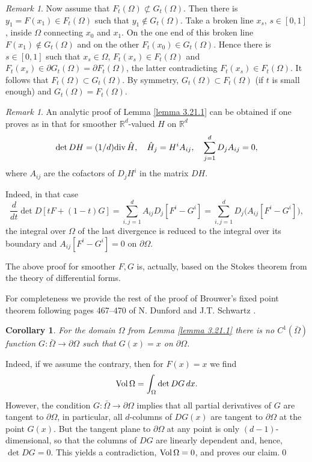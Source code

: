 \documentclass[11pt, reqno]{amsart}
\newtheorem{corollary}[theorem]{Corollary}
\theoremstyle{remark}
\newtheorem{remark}[theorem]{Remark}
\theoremstyle{definition}
\newcommand{\Vol}{\text{\rm Vol}\,}
\newcommand\bR{\mathbb{R}}
\begin{document}
\begin{remark}
Now assume that $F_{t}(\Omega)\not\subset
 G_{t}(\Omega)$. Then there is $y_{1}=F(x_{1})\in 
F_{t}(\Omega)$ such that $y_{1}\not\in 
G_{t}(\Omega)$. Take a broken line $x_{s}$, $s\in[0,1]$,
 inside
$\Omega$ connecting $x_{0}$ and $x_{1}$.
On the one end of this broken line $F(x_{1})
\not\in 
G_{t}(\Omega)$ and on the other $F_{t}(x_{0})
\in G_{t}(\Omega)$. Hence there is $s\in[0,1]$
such that $x_{s}\in \Omega$, $F_{t}(x_{s})
\in F_{t}(\Omega)$ and $F_{t}(x_{s})\in \partial
G_{t}(\Omega)=\partial
F_{t}(\Omega)$, the latter contradicting
$F_{t}(x_{s})
\in F_{t}(\Omega)$. It follows that 
$F_{t}(\Omega)\subset G_{t}(\Omega)$.
By symmetry, $G_{t}(\Omega)\subset F_{t}(\Omega)$
(if $t$ is small enough) and 
$G_{t}(\Omega)= F_{t}(\Omega)$.
\end{remark}
 
 \begin{remark}
An analytic proof of Lemma \ref{lemma 3.21.1} can be obtained
if one proves as in \cite{DS_58} that for smoother $\bR^{d}$-valued $H$
on $\bR^{d}$
$$
\det D H=(1/d){\rm div}\,\hat H,\quad \hat H_{j}=H^{i}A_{ij},
\quad\sum_{j=1}^{d}D_{j}A_{ij}=0,
$$
where $A_{ij}$ are the cofactors of
 $ D_{j} H^{i}  $ in the matrix 
$D H$.

Indeed, in that case
$$
\frac{d}{dt}\det D [tF+(1-t)G]
=\sum_{i,j=1}^{d}A_{ij}D_{j}[F^{i}-G^{i}] 
=\sum_{i,j=1}^{d}D_{j}\big(A_{ij}[F^{i}-G^{i}] \big),
$$
the integral over $\Omega$ of the last divergence
is reduced to the integral over its boundary 
and $A_{ij}[F^{i}-G^{i}]=0$ on $\partial \Omega$.

The above  proof  for smoother
$F,G$ is, actually, based on the Stokes theorem
from the theory of differential forms.

\end{remark}

 For completeness we provide the rest of the
proof of Brouwer's fixed point theorem
following 
pages 467--470 of
N. Dunford and J.T. Schwartz \cite{DS_58}.

 
 
\begin{corollary}
                                  \label{corollary 3.21.1}
For the domain $\Omega$ from Lemma \ref{lemma 3.21.1}   
 there is no $C^{1}(\bar{\Omega})$ function
$G:\bar{\Omega} \to\partial \Omega$ such that 
$G(x)=x$ on $\partial \Omega$.

\end{corollary}

Indeed, if we assume the contrary, then for $F(x)=x$
we find
$$
\Vol \Omega=\int_{\Omega}\det DG\,dx.
$$
However,   the condition
$G:\bar{\Omega} \to\partial \Omega$ implies that
all partial derivatives of $G$ are tangent to
$\partial\Omega$, in particular,
all $d$-columns of $DG(x)$ are
tangent to $\partial\Omega$ at the point $G(x)$.
But the tangent plane to $\partial\Omega$
at any point is only $(d-1)$-dimensional,
so that the columns of $DG$ are linearly dependent 
and, hence, $\det DG=0$. This yields
a contradiction, $\Vol \Omega=0$, and proves our claim.\qed
\end{document}
